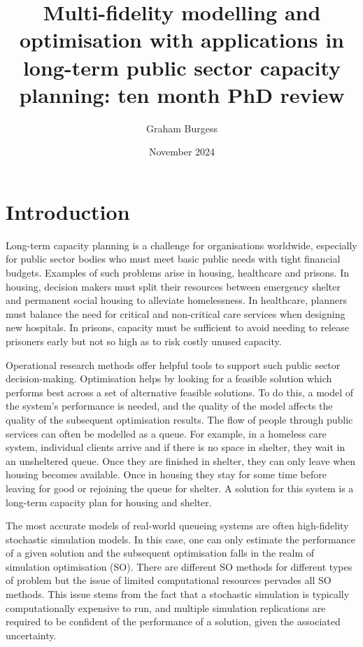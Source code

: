 \documentclass[12pt,a4paper]{article}
\title{Multi-fidelity modelling and optimisation with applications in long-term public sector capacity planning: ten month PhD review}
\author{Graham Burgess}
\date{November 2024}
\begin{document}
%
\maketitle
%
\section{Introduction}
%
Long-term capacity planning is a challenge for organisations worldwide, especially for public sector bodies who must meet basic public needs with tight financial budgets. Examples of such problems arise in housing, healthcare and prisons. In housing, decision makers must split their resources between emergency shelter and permanent social housing to alleviate homelessness. In healthcare, planners must balance the need for critical and non-critical care services when designing new hospitals. In prisons, capacity must be sufficient to avoid needing to release prisoners early but not so high as to risk costly unused capacity.

Operational research methods offer helpful tools to support such public sector decision-making. Optimisation helps by looking for a feasible solution which performs best across a set of alternative feasible solutions. To do this, a model of the system's performance is needed, and the quality of the model affects the quality of the subsequent optimisation results. The flow of people through public services can often be modelled as a queue. For example, in a homeless care system, individual clients arrive and if there is no space in shelter, they wait in an unsheltered queue. Once they are finished in shelter, they can only leave when housing becomes available. Once in housing they stay for some time before leaving for good or rejoining the queue for shelter. A solution for this system is a long-term capacity plan for housing and shelter.

The most accurate models of real-world queueing systems are often high-fidelity stochastic simulation models. In this case, one can only estimate the performance of a given solution and the subsequent optimisation falls in the realm of simulation optimisation (SO). There are different SO methods for different types of problem but the issue of limited computational resources pervades all SO methods. This issue stems from the fact that a stochastic simulation is typically computationally expensive to run, and multiple simulation replications are required to be confident of the performance of a solution, given the associated uncertainty.
\end{document}
